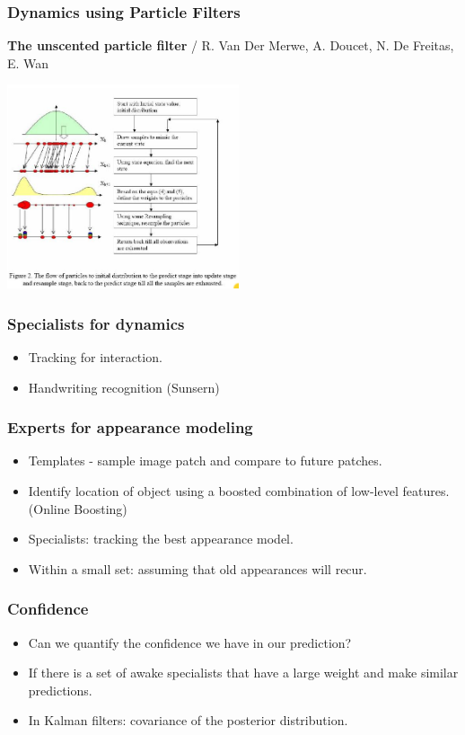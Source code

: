 \documentclass{beamer}
\begin{document}
\begin{frame}
\frametitle{Dynamics using Particle Filters}
{\bf The unscented particle filter} / R. Van Der Merwe, A. Doucet, N. De Freitas, E. Wan
\begin{center}
\includegraphics[height=6cm]{figures/ParticleFilters.png}
\end{center}
\end{frame}

\begin{frame}
\frametitle{Specialists for dynamics}
\begin{itemize}
\item Tracking for interaction.
\item Handwriting recognition (Sunsern)
\end{itemize}
\end{frame}

\begin{frame}
\frametitle{Experts for appearance modeling}
\begin{itemize}
\item Templates - sample image patch and compare to future patches.
\item Identify location of object using a boosted combination of
  low-level features. (Online Boosting)
\item Specialists: tracking the best appearance model.
\item Within a small set: assuming that old appearances will recur.
\end{itemize}
\end{frame}

\begin{frame}
\frametitle{Confidence}
\begin{itemize}
\item Can we quantify the confidence we have in our prediction?
\item If there is a set of awake specialists that have a large weight
  and make similar predictions.
\item In Kalman filters: covariance of the posterior distribution.
\end{itemize}
\end{frame}
\end{document}
